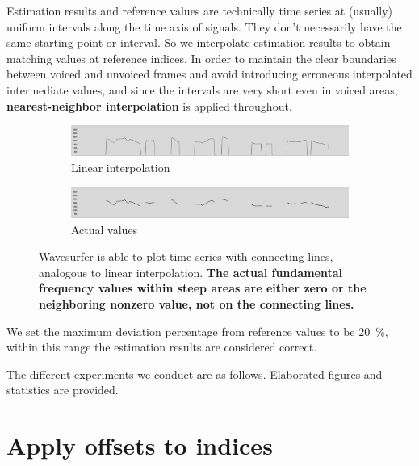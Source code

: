 \documentclass[11pt,a4paper]{report}
\begin{document}
Estimation results and reference values are technically time series at (usually) uniform intervals along the time axis of signals.
They don't necessarily have the same starting point or interval.
So we interpolate estimation results to obtain matching values at reference indices.
In order to maintain the clear boundaries between voiced and unvoiced frames and avoid introducing erroneous interpolated intermediate values, and since the intervals are very short even in voiced areas, \textbf{nearest-neighbor interpolation} is applied throughout.

\begin{figure}[htbp]
  \centering
  \begin{subfigure}{\textwidth}
    \includegraphics[width=\textwidth]{f0s-lp.png}
    \caption{Linear interpolation}
    \label{fig:f0s-lp}
  \end{subfigure}

  \begin{subfigure}{\textwidth}
    \includegraphics[width=\textwidth]{f0s-real.png}
    \caption{Actual values}
    \label{fig:f0s-real}
  \end{subfigure}

  \caption[Data plotting options in Wavesurfer.]{Wavesurfer is able to plot time series with connecting lines, analogous to linear interpolation.
    \textbf{The actual fundamental frequency values within steep areas are either zero or the neighboring nonzero value, not on the connecting lines.}}
  \label{fig:f0s}
\end{figure}

We set the maximum deviation percentage from reference values to be \SI{20}{\percent}, within this range the estimation results are considered correct.

The different experiments we conduct are as follows.
Elaborated figures and statistics are provided.

\newpage

\section{Apply offsets to indices}
\end{document}
